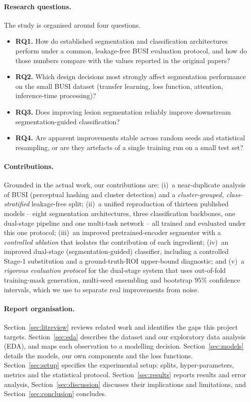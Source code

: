 \documentclass[11pt]{article}
\begin{document}
\paragraph{Research questions.}
The study is organised around four questions.
\begin{itemize}
  \item \textbf{RQ1.} How do established segmentation and classification
  architectures perform under a common, leakage-free BUSI evaluation protocol,
  and how do those numbers compare with the values reported in the original
  papers?
  \item \textbf{RQ2.} Which design decisions most strongly affect segmentation
  performance on the small BUSI dataset (transfer learning, loss function,
  attention, inference-time processing)?
  \item \textbf{RQ3.} Does improving lesion segmentation reliably improve
  downstream segmentation-guided classification?
  \item \textbf{RQ4.} Are apparent improvements stable across random seeds and
  statistical resampling, or are they artefacts of a single training run on a
  small test set?
\end{itemize}

\paragraph{Contributions.}
Grounded in the actual work, our contributions are:
(i)~a near-duplicate analysis of BUSI (perceptual hashing and cluster detection)
and a \emph{cluster-grouped, class-stratified} leakage-free split;
(ii)~a unified reproduction of thirteen published models -- eight segmentation
architectures, three classification backbones, one dual-stage pipeline and one
multi-task network -- all trained and evaluated under this one protocol;
(iii)~an improved pretrained-encoder segmenter with a \emph{controlled ablation}
that isolates the contribution of each ingredient;
(iv)~an improved dual-stage (segmentation-guided) classifier, including a
controlled Stage-1 substitution and a ground-truth-ROI upper-bound diagnostic;
and
(v)~a \emph{rigorous evaluation protocol} for the dual-stage system that uses
out-of-fold training-mask generation, multi-seed ensembling and bootstrap
$95\%$ confidence intervals, which we use to separate real improvements from
noise.

\paragraph{Report organisation.}
Section~\ref{sec:litreview} reviews related work and identifies the gaps this
project targets. Section~\ref{sec:eda} describes the dataset and our exploratory
data analysis (EDA), and maps each observation to a modelling decision.
Section~\ref{sec:models} details the models, our own components and the loss
functions. Section~\ref{sec:setup} specifies the experimental setup: splits,
hyper-parameters, metrics and the statistical protocol. Section~\ref{sec:results}
reports results and error analysis, Section~\ref{sec:discussion} discusses their
implications and limitations, and Section~\ref{sec:conclusion} concludes.
\end{document}
